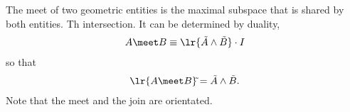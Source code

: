 The meet of two geometric entities is the maximal subspace that is shared by both entities.
Th intersection.
It can be determined by duality,
\begin{align}
  A \meet B \equiv \lr{\tilde{A}\wedge \tilde{B}}\cdot I
\end{align}
so that
\begin{align}
  \lr{A\meet B}\tilde{} = \tilde{A}\wedge\tilde{B}.
\end{align}
Note that the meet and the join are orientated.










